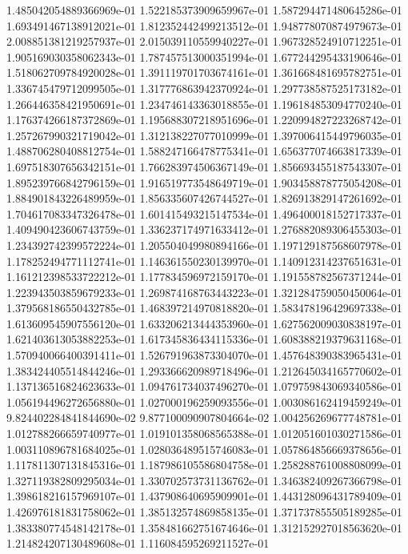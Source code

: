 1.485042054889366969e-01
1.522185373909659967e-01
1.587294471480645286e-01
1.693491467138912021e-01
1.812352442499213512e-01
1.948778070874979673e-01
2.008851381219257937e-01
2.015039110559940227e-01
1.967328524910712251e-01
1.905169030358062343e-01
1.787457513000351994e-01
1.677244295433190646e-01
1.518062709784920028e-01
1.391119701703674161e-01
1.361668481695782751e-01
1.336745479712099505e-01
1.317776863942370924e-01
1.297738587525173182e-01
1.266446358421950691e-01
1.234746143363018855e-01
1.196184853094770240e-01
1.176374266187372869e-01
1.195688307218951696e-01
1.220994827223268742e-01
1.257267990321719042e-01
1.312138227077010999e-01
1.397006415449796035e-01
1.488706280408812754e-01
1.588247166478775341e-01
1.656377074663817339e-01
1.697518307656342151e-01
1.766283974506367149e-01
1.856693455187543307e-01
1.895239766842796159e-01
1.916519773548649719e-01
1.903458878775054208e-01
1.884901843226489959e-01
1.856335607426744527e-01
1.826913829147261692e-01
1.704617083347326478e-01
1.601415493215147534e-01
1.496400018152717337e-01
1.409490423606743759e-01
1.336237174971633412e-01
1.276882089306455303e-01
1.234392742399572224e-01
1.205504049980894166e-01
1.197129187568607978e-01
1.178252494771112741e-01
1.146361550230139970e-01
1.140912314237651631e-01
1.161212398533722212e-01
1.177834596972159170e-01
1.191558782567371244e-01
1.223943503859679233e-01
1.269874168763443223e-01
1.321284759050450064e-01
1.379568186550432785e-01
1.468397214970818820e-01
1.583478196429697338e-01
1.613609545907556120e-01
1.633206213444353960e-01
1.627562009030838197e-01
1.621403613053882253e-01
1.617345836434115336e-01
1.608388219379631168e-01
1.570940066400391411e-01
1.526791963873304070e-01
1.457648390383965431e-01
1.383424405514844246e-01
1.293366620989718496e-01
1.212645034165770602e-01
1.137136516824623633e-01
1.094761734037496270e-01
1.079759843069340586e-01
1.056194496272656880e-01
1.027000196259093556e-01
1.003086162419459249e-01
9.824402284841844690e-02
9.877100090907804664e-02
1.004256269677748781e-01
1.012788266659740977e-01
1.019101358068565388e-01
1.012051601030271586e-01
1.003110896781684025e-01
1.028036489515746083e-01
1.057864856669378656e-01
1.117811307131845316e-01
1.187986105586804758e-01
1.258288761008808099e-01
1.327119382809295034e-01
1.330702573731136762e-01
1.346382409267366798e-01
1.398618216157969107e-01
1.437908640695909901e-01
1.443128096431789409e-01
1.426976181831758062e-01
1.385132574869858135e-01
1.371737855505189285e-01
1.383380774548142178e-01
1.358481662751674646e-01
1.312152927018563620e-01
1.214824207130489608e-01
1.116084595269211527e-01
